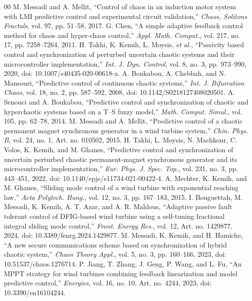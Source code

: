 \documentclass[conference]{IEEEtran}
\begin{document}
\begin{thebibliography}{00}
 M. Messadi and A. Mellit, ``Control of chaos in an induction motor system with LMI predictive control and experimental circuit validation,'' \textit{Chaos, Solitons Fractals}, vol. 97, pp. 51--58, 2017.
 G. Chen, ``A simple adaptive feedback control method for chaos and hyper-chaos control,'' \textit{Appl. Math. Comput.}, vol. 217, no. 17, pp. 7258--7264, 2011.
 H. Takhi, K. Kemih, L. Moysis, \textit{et al.}, ``Passivity based control and synchronization of perturbed uncertain chaotic systems and their microcontroller implementation,'' \textit{Int. J. Dyn. Control}, vol. 8, no. 3, pp. 973--990, 2020, doi: 10.1007/s40435-020-00618-x.
 A. Boukabou, A. Chebbah, and N. Mansouri, ``Predictive control of continuous chaotic systems,'' \textit{Int. J. Bifurcation Chaos}, vol. 18, no. 2, pp. 587--592, 2008, doi: 10.1142/S0218127408020501.
 A. Senouci and A. Boukabou, ``Predictive control and synchronization of chaotic and hyperchaotic systems based on a T--S fuzzy model,'' \textit{Math. Comput. Simul.}, vol. 105, pp. 62--78, 2014.
 M. Messadi and A. Mellit, ``Predictive control of a chaotic permanent magnet synchronous generator in a wind turbine system,'' \textit{Chin. Phys. B}, vol. 24, no. 1, Art. no. 010502, 2015.
 H. Takhi, L. Moysis, N. Machkour, C. Volos, K. Kemih, and M. Ghanes, ``Predictive control and synchronization of uncertain perturbed chaotic permanent-magnet synchronous generator and its microcontroller implementation,'' \textit{Eur. Phys. J. Spec. Top.}, vol. 231, no. 3, pp. 443--451, 2022, doi: 10.1140/epjs/s11734-021-00422-4.
 A. Mechter, K. Kemih, and M. Ghanes, ``Sliding mode control of a wind turbine with exponential reaching law,'' \textit{Acta Polytech. Hung.}, vol. 12, no. 3, pp. 167--183, 2015.
 I. Bouguettah, M. Messadi, K. Kemih, A. T. Azar, and A. R. Mahlous, ``Adaptive passive fault tolerant control of DFIG-based wind turbine using a self-tuning fractional integral sliding mode control,'' \textit{Front. Energy Res.}, vol. 12, Art. no. 1429877, 2024, doi: 10.3389/fenrg.2024.1429877.
 M. Messadi, K. Kemih, and H. Hamiche, ``A new secure communications scheme based on synchronization of hybrid chaotic system,'' \textit{Chaos Theory Appl.}, vol. 5, no. 3, pp. 160--166, 2023, doi: 10.51537/chaos.1276714.
 P. Jiang, T. Zhang, J. Geng, P. Wang, and L. Fu, ``An MPPT strategy for wind turbines combining feedback linearization and model predictive control,'' \textit{Energies}, vol. 16, no. 10, Art. no. 4244, 2023, doi: 10.3390/en16104244.

\end{thebibliography}
\end{document}
